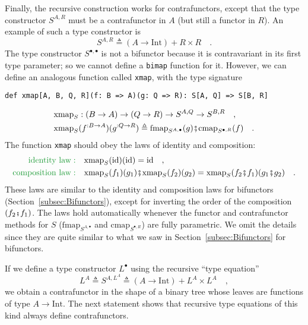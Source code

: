 Finally, the recursive construction works for contrafunctors, except
that the type constructor $S^{A,R}$ must be a contrafunctor in $A$
(but still a functor in $R$). An example of such a type constructor
is
\begin{equation}
S^{A,R}\triangleq\left(A\rightarrow\text{Int}\right)+R\times R\quad.\label{eq:f-example-contra-bifunctor}
\end{equation}
The type constructor $S^{\bullet,\bullet}$ is not a bifunctor because
it is contravariant in its first type parameter; so we cannot define
a \lstinline!bimap! function for it. However, we can define an analogous
function called \lstinline!xmap!, with the type signature
\begin{lstlisting}
def xmap[A, B, Q, R](f: B => A)(g: Q => R): S[A, Q] => S[B, R]
\end{lstlisting}
\begin{align*}
 & \text{xmap}_{S}:\left(B\rightarrow A\right)\rightarrow\left(Q\rightarrow R\right)\rightarrow S^{A,Q}\rightarrow S^{B,R}\quad,\\
 & \text{xmap}_{S}(f^{:B\rightarrow A})(g^{:Q\rightarrow R})\triangleq\text{fmap}_{S^{A,\bullet}}(g)\bef\text{cmap}_{S^{\bullet,R}}(f)\quad.
\end{align*}
The function \lstinline!xmap! should obey the laws of identity and
composition:
\begin{align}
{\color{greenunder}\text{identity law}:}\quad & \text{xmap}_{S}(\text{id})(\text{id})=\text{id}\quad,\label{eq:f-profunctor-identity-law}\\
{\color{greenunder}\text{composition law}:}\quad & \text{xmap}_{S}(f_{1})(g_{1})\bef\text{xmap}_{S}(f_{2})(g_{2})=\text{xmap}_{S}(f_{2}\bef f_{1})(g_{1}\bef g_{2})\quad.\label{eq:f-profunctor-composition-law}
\end{align}
These laws are similar to the identity and composition laws for bifunctors
(Section~\ref{subsec:Bifunctors}), except for inverting the order
of the composition $\left(f_{2}\bef f_{1}\right)$. The laws hold
automatically whenever the functor and contrafunctor methods for $S$
($\text{fmap}_{S^{A,\bullet}}$ and $\text{cmap}_{S^{\bullet,R}}$)
are fully parametric. We omit the details since they are quite similar
to what we saw in Section~\ref{subsec:Bifunctors} for bifunctors.

If we define a type constructor $L^{\bullet}$ using the recursive
\textsf{``}type equation\textsf{''}
\[
L^{A}\triangleq S^{A,L^{A}}\triangleq\left(A\rightarrow\text{Int}\right)+L^{A}\times L^{A}\quad,
\]
we obtain a contrafunctor in the shape of a binary tree whose leaves
are functions of type $A\rightarrow\text{Int}$. The next statement
shows that recursive type equations of this kind always define contrafunctors.

